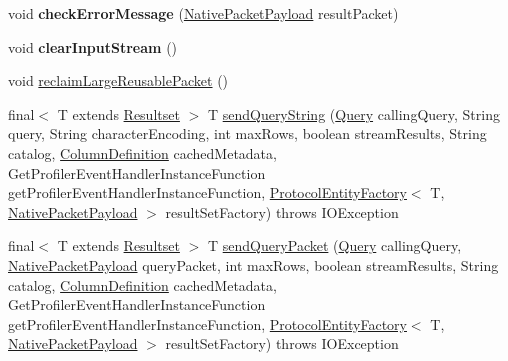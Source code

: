 \begin{DoxyCompactItemize}
\mbox{\label{classcom_1_1mysql_1_1cj_1_1protocol_1_1a_1_1_native_protocol_a51128705ba4a4490581947a160c3137c}} 
void {\bfseries check\+Error\+Message} (\mbox{\hyperlink{classcom_1_1mysql_1_1cj_1_1protocol_1_1a_1_1_native_packet_payload}{Native\+Packet\+Payload}} result\+Packet)
\item 
\mbox{\label{classcom_1_1mysql_1_1cj_1_1protocol_1_1a_1_1_native_protocol_ac54e352021183973a60e75d606b61b0d}} 
void {\bfseries clear\+Input\+Stream} ()
\item 
void \mbox{\hyperlink{classcom_1_1mysql_1_1cj_1_1protocol_1_1a_1_1_native_protocol_abe920baf0e942a3f227a86051078c7d5}{reclaim\+Large\+Reusable\+Packet}} ()
\item 
final$<$ T extends \mbox{\hyperlink{interfacecom_1_1mysql_1_1cj_1_1protocol_1_1_resultset}{Resultset}} $>$ T \mbox{\hyperlink{classcom_1_1mysql_1_1cj_1_1protocol_1_1a_1_1_native_protocol_a30e77ec54f66714f55e8f1c0872b8cfe}{send\+Query\+String}} (\mbox{\hyperlink{interfacecom_1_1mysql_1_1cj_1_1_query}{Query}} calling\+Query, String query, String character\+Encoding, int max\+Rows, boolean stream\+Results, String catalog, \mbox{\hyperlink{interfacecom_1_1mysql_1_1cj_1_1protocol_1_1_column_definition}{Column\+Definition}} cached\+Metadata, Get\+Profiler\+Event\+Handler\+Instance\+Function get\+Profiler\+Event\+Handler\+Instance\+Function, \mbox{\hyperlink{interfacecom_1_1mysql_1_1cj_1_1protocol_1_1_protocol_entity_factory}{Protocol\+Entity\+Factory}}$<$ T, \mbox{\hyperlink{classcom_1_1mysql_1_1cj_1_1protocol_1_1a_1_1_native_packet_payload}{Native\+Packet\+Payload}} $>$ result\+Set\+Factory)  throws I\+O\+Exception 
\item 
final$<$ T extends \mbox{\hyperlink{interfacecom_1_1mysql_1_1cj_1_1protocol_1_1_resultset}{Resultset}} $>$ T \mbox{\hyperlink{classcom_1_1mysql_1_1cj_1_1protocol_1_1a_1_1_native_protocol_a08597317ed6335e40dafa52f26066766}{send\+Query\+Packet}} (\mbox{\hyperlink{interfacecom_1_1mysql_1_1cj_1_1_query}{Query}} calling\+Query, \mbox{\hyperlink{classcom_1_1mysql_1_1cj_1_1protocol_1_1a_1_1_native_packet_payload}{Native\+Packet\+Payload}} query\+Packet, int max\+Rows, boolean stream\+Results, String catalog, \mbox{\hyperlink{interfacecom_1_1mysql_1_1cj_1_1protocol_1_1_column_definition}{Column\+Definition}} cached\+Metadata, Get\+Profiler\+Event\+Handler\+Instance\+Function get\+Profiler\+Event\+Handler\+Instance\+Function, \mbox{\hyperlink{interfacecom_1_1mysql_1_1cj_1_1protocol_1_1_protocol_entity_factory}{Protocol\+Entity\+Factory}}$<$ T, \mbox{\hyperlink{classcom_1_1mysql_1_1cj_1_1protocol_1_1a_1_1_native_packet_payload}{Native\+Packet\+Payload}} $>$ result\+Set\+Factory)  throws I\+O\+Exception 

\end{DoxyCompactItemize}
